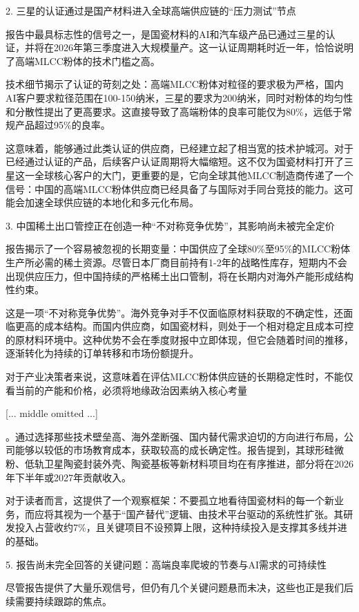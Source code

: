 \documentclass[11pt]{ctexart}
\begin{document}
2. 三星的认证通过是国产材料进入全球高端供应链的“压力测试”节点

报告中最具标志性的信号之一，是国瓷材料的AI和汽车级产品已通过三星的认证，并将在2026年第三季度进入大规模量产。这一认证周期耗时近一年，恰恰说明了高端MLCC粉体的技术门槛之高。

技术细节揭示了认证的苛刻之处：高端MLCC粉体对粒径的要求极为严格，国内AI客户要求粒径范围在100-150纳米，三星的要求为200纳米，同时对粉体的均匀性和分散性提出了更高要求。这直接导致了高端粉体的良率可能仅为80\%，远低于常规产品超过95\%的良率。

这意味着，能够通过此类认证的供应商，已经建立起了相当宽的技术护城河。对于已经通过认证的产品，后续客户认证周期将大幅缩短。这不仅为国瓷材料打开了三星这一全球核心客户的大门，更重要的是，它向全球其他MLCC制造商传递了一个信号：中国的高端MLCC粉体供应商已经具备了与国际对手同台竞技的能力。这可能会加速全球供应链的本地化和多元化布局。

3. 中国稀土出口管控正在创造一种“不对称竞争优势”，其影响尚未被完全定价

报告揭示了一个容易被忽视的长期变量：中国供应了全球80\%至95\%的MLCC粉体生产所必需的稀土资源。尽管日本厂商目前持有1-2年的战略性库存，短期内不会出现供应压力，但中国持续的严格稀土出口管制，将在长期内对海外产能形成结构性约束。

这是一项“不对称竞争优势”。海外竞争对手不仅面临原材料获取的不确定性，还面临更高的成本结构。而国内供应商，如国瓷材料，则处于一个相对稳定且成本可控的原材料环境中。这种优势不会在季度财报中立即体现，但它会随着时间的推移，逐渐转化为持续的订单转移和市场份额提升。

对于产业决策者来说，这意味着在评估MLCC粉体供应链的长期稳定性时，不能仅看当前的产能和价格，必须将地缘政治因素纳入核心考量

[... middle omitted ...]

。通过选择那些技术壁垒高、海外垄断强、国内替代需求迫切的方向进行布局，公司能够以较低的市场教育成本，获取较高的成长确定性。报告提到，其球形硅微粉、低轨卫星陶瓷封装外壳、陶瓷基板等新材料项目均在有序推进，部分将在2026年下半年或2027年贡献收入。

对于读者而言，这提供了一个观察框架：不要孤立地看待国瓷材料的每一个新业务，而应将其视为一个基于“国产替代”逻辑、由技术平台驱动的系统性扩张。其研发投入占营收约7\%，且关键项目不设预算上限，这种持续投入是支撑其多线并进的基础。

5. 报告尚未完全回答的关键问题：高端良率爬坡的节奏与AI需求的可持续性

尽管报告提供了大量乐观信号，但仍有几个关键问题悬而未决，这些也正是我们后续需要持续跟踪的焦点。
\end{document}
